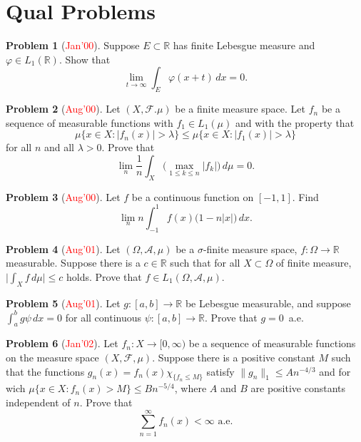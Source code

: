 \documentclass[12pt,reqno]{amsart}
\def\field#1{\mathbb{#1}}
\def\abs#1{\lvert {#1} \rvert}
\def\Lpnorm#1#2{\lVert {#1} \rVert_{#2}}
\def\redc#1{[\textcolor{red}{#1}]}
\theoremstyle{definition}
\newtheorem{problem}{Problem}
\theoremstyle{remark}
\begin{document}
\section{Qual Problems}
\begin{problem}\redc{Jan'00}
  Suppose $E \subset \field{R}$ has finite Lebesgue measure and
  $\varphi \in L_1(\field{R})$.  Show that
  \begin{equation*}
    \lim_{t \to \infty} \int_E \varphi(x+t)\, dx = 0.
  \end{equation*}
\end{problem}
\begin{problem}\redc{Aug'00}
  Let $(X, \mathcal{F}. \mu)$ be a finite measure space. Let $f_n$ be
  a sequence of measurable functions with $f_1 \in L_1(\mu)$ and with
  the property that
  \begin{equation*}
    \mu\{ x \in X : \abs{f_n(x)} > \lambda \} \leq \mu \{ x \in X :
    \abs{f_1(x)} > \lambda \}
  \end{equation*}
  for all $n$ and all $\lambda > 0$. Prove that
  \begin{equation*}
    \lim_n \frac{1}{n}\int_X \big( \max_{1 \leq k \leq n} \abs{f_k}
    \big)\, d\mu = 0. 
  \end{equation*}
\end{problem}
\begin{problem}\redc{Aug'00}
  Let $f$ be a continuous function on $[-1,1]$. Find
  \begin{equation*}
    \lim_n n\int_{-1}^1 f(x) \big( 1 - n \abs{x} \big)\, dx.
  \end{equation*}
\end{problem}
\begin{problem}\redc{Aug'01}
  Let $(\Omega, \mathcal{A}, \mu)$ be a $\sigma$-finite measure space,
  $f\colon \Omega \to \field{R}$ measurable.  Suppose there is a $c
  \in \field{R}$ such that for all $X \subset \Omega$ of finite
  measure, $\abs{\int_X f\, d\mu} \leq c$ holds.  Prove that $f \in
  L_1(\Omega, \mathcal{A}, \mu)$.
\end{problem}
\begin{problem}\redc{Aug'01}
  Let $g\colon [a,b] \to \field{R}$ be Lebesgue measurable, and
  suppose $\int_a^b g\psi\, dx = 0$ for all continuous $\psi\colon
  [a,b] \to \field{R}$.  Prove that $g = 0$~a.e.
\end{problem}
\begin{problem}\redc{Jan'02}
  Let $f_n\colon X \to [0,\infty)$ be a sequence of measurable
  functions on the measure space $(X, \mathcal{F}, \mu)$.  Suppose
  there is a positive constant $M$ such that the functions $g_n(x) =
  f_n(x) \chi_{\{ f_n \leq M\}}$ satisfy $\Lpnorm{g_n}{1} \leq
  An^{-4/3}$ and for wich $\mu\{ x \in X : f_n(x) > M\} \leq
  Bn^{-5/4}$, where $A$ and $B$ are positive constants independent of
  $n$.  Prove that
  \begin{equation*}
    \sum_{n=1}^\infty f_n(x) < \infty\text{ a.e.}
  \end{equation*}
\end{problem}
\end{document}
